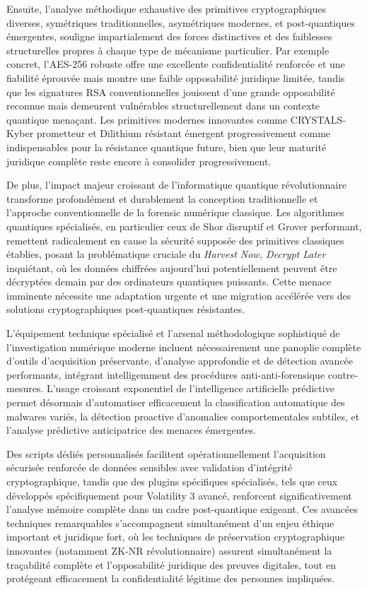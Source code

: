 \documentclass[12pt, a4paper]{article}
\begin{document}
	Ensuite, l'analyse méthodique exhaustive des primitives cryptographiques diverses, symétriques traditionnelles, asymétriques modernes, et post-quantiques émergentes, souligne impartialement des forces distinctives et des faiblesses structurelles propres à chaque type de mécanisme particulier. Par exemple concret, l'AES-256 robuste offre une excellente confidentialité renforcée et une fiabilité éprouvée mais montre une faible opposabilité juridique limitée, tandis que les signatures RSA conventionnelles jouissent d'une grande opposabilité reconnue mais demeurent vulnérables structurellement dans un contexte quantique menaçant. Les primitives modernes innovantes comme CRYSTALS-Kyber prometteur et Dilithium résistant émergent progressivement comme indispensables pour la résistance quantique future, bien que leur maturité juridique complète reste encore à consolider progressivement.
	
	De plus, l'impact majeur croissant de l'informatique quantique révolutionnaire transforme profondément et durablement la conception traditionnelle et l'approche conventionnelle de la forensic numérique classique. Les algorithmes quantiques spécialisés, en particulier ceux de Shor disruptif et Grover performant, remettent radicalement en cause la sécurité supposée des primitives classiques établies, posant la problématique cruciale du \textit{Harvest Now, Decrypt Later} inquiétant, où les données chiffrées aujourd'hui potentiellement peuvent être décryptées demain par des ordinateurs quantiques puissants. Cette menace imminente nécessite une adaptation urgente et une migration accélérée vers des solutions cryptographiques post-quantiques résistantes.
	
	\medskip
	L'équipement technique spécialisé et l'arsenal méthodologique sophistiqué de l'investigation numérique moderne incluent nécessairement une panoplie complète d'outils d'acquisition préservante, d'analyse approfondie et de détection avancée performants, intégrant intelligemment des procédures anti-anti-forensique contre-mesures. L'usage croissant exponentiel de l'intelligence artificielle prédictive permet désormais d'automatiser efficacement la classification automatique des malwares variés, la détection proactive d'anomalies comportementales subtiles, et l'analyse prédictive anticipatrice des menaces émergentes.
	
	Des scripts dédiés personnalisés facilitent opérationnellement l'acquisition sécurisée renforcée de données sensibles avec validation d'intégrité cryptographique, tandis que des plugins spécifiques spécialisés, tels que ceux développés spécifiquement pour Volatility 3 avancé, renforcent significativement l'analyse mémoire complète dans un cadre post-quantique exigeant. Ces avancées techniques remarquables s'accompagnent simultanément d'un enjeu éthique important et juridique fort, où les techniques de préservation cryptographique innovantes (notamment ZK-NR révolutionnaire) assurent simultanément la traçabilité complète et l'opposabilité juridique des preuves digitales, tout en protégeant efficacement la confidentialité légitime des personnes impliquées.
	
\end{document}
